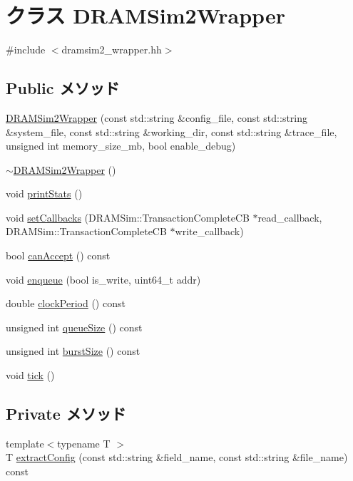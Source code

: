 \hypertarget{classDRAMSim2Wrapper}{
\section{クラス DRAMSim2Wrapper}
\label{classDRAMSim2Wrapper}
}


{\ttfamily \#include $<$dramsim2\_\-wrapper.hh$>$}\subsection*{Public メソッド}
\begin{DoxyCompactItemize}
\item 
\hyperlink{classDRAMSim2Wrapper_afb9d47202b904139c97115bb9b11a1f2}{DRAMSim2Wrapper} (const std::string \&config\_\-file, const std::string \&system\_\-file, const std::string \&working\_\-dir, const std::string \&trace\_\-file, unsigned int memory\_\-size\_\-mb, bool enable\_\-debug)
\item 
\hyperlink{classDRAMSim2Wrapper_ae3508f5d656008b2209e4455d1649428}{$\sim$DRAMSim2Wrapper} ()
\item 
void \hyperlink{classDRAMSim2Wrapper_a0beecd7e864561c9474bc80e993556bf}{printStats} ()
\item 
void \hyperlink{classDRAMSim2Wrapper_ae7cabadc2302c5b4899c5db3b66b2549}{setCallbacks} (DRAMSim::TransactionCompleteCB $\ast$read\_\-callback, DRAMSim::TransactionCompleteCB $\ast$write\_\-callback)
\item 
bool \hyperlink{classDRAMSim2Wrapper_a34b4e8ea869adbb57c71b30c55e6f5bd}{canAccept} () const 
\item 
void \hyperlink{classDRAMSim2Wrapper_ae247cb4ece9657b8730c721920c23ab7}{enqueue} (bool is\_\-write, uint64\_\-t addr)
\item 
double \hyperlink{classDRAMSim2Wrapper_a6efe80b239837bd53bf8d8694c665993}{clockPeriod} () const 
\item 
unsigned int \hyperlink{classDRAMSim2Wrapper_a667ea9ca9654bced2242c6ccd77599ee}{queueSize} () const 
\item 
unsigned int \hyperlink{classDRAMSim2Wrapper_ad4ebfa7de0b48f306bf4d5e736843d62}{burstSize} () const 
\item 
void \hyperlink{classDRAMSim2Wrapper_a873dd91783f9efb4a590aded1f70d6b0}{tick} ()
\end{DoxyCompactItemize}
\subsection*{Private メソッド}
\begin{DoxyCompactItemize}
\item 
{\footnotesize template$<$typename T $>$ }\\T \hyperlink{classDRAMSim2Wrapper_aafb8a8238026119400ee0c470e3f7695}{extractConfig} (const std::string \&field\_\-name, const std::string \&file\_\-name) const 
\end{DoxyCompactItemize}
